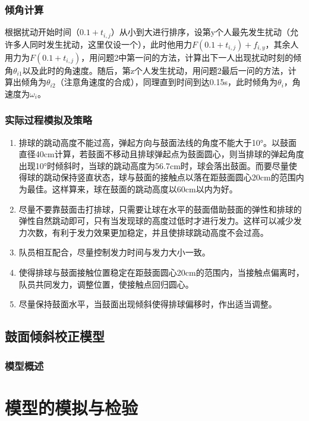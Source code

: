 \documentclass[withoutpreface,bwprint]{cumcmthesis} %
\begin{document}
\subsubsection{倾角计算}
根据扰动开始时间（$0.1+t_{i,j}$）从小到大进行排序，设第y个人最先发生扰动（允许多人同时发生扰动，这里仅设一个），此时他用力$F(0.1+t_{i,j})+f_{i,y}$，其余人用力为$F(0.1+t_{i,j})$，用问题2中第一问的方法，计算出下一人出现扰动时刻的倾角$\theta_{i1}$以及此时的角速度。随后，第z个人发生扰动，用问题2最后一问的方法，计算出倾角为$\theta _{i2}$（注意角速度的合成），同理直到时间到达0.15s，此时倾角为$\theta_{i}$，角速度为$\omega_i$。

\subsubsection{实际过程模拟及策略}
\begin{enumerate}
\item 排球的跳动高度不能过高，弹起方向与鼓面法线的角度不能大于10°。以鼓面直径40cm计算，若鼓面不移动且排球弹起点为鼓面圆心，则当排球的弹起角度出现10°时倾斜时，当球的跳动高度为56.7cm时，球会落出鼓面。而要尽量使得球的跳动保持竖直状态，球与鼓面的接触点以落在距鼓面圆心20cm的范围内为最佳。这样算来，球在鼓面的跳动高度以60cm以内为好。
\item 尽量不要靠鼓面击打排球，只需要让球在水平的鼓面借助鼓面的弹性和排球的弹性自然跳动即可，只有当发现球的高度过低时才进行发力。这样可以减少发力次数，有利于发力效果更加稳定，并且使排球跳动高度不会过高。
\item 队员相互配合，尽量控制发力时间与发力大小一致。
\item 使得排球与鼓面接触位置稳定在距鼓面圆心20cm的范围内，当接触点偏离时，队员共同发力，调整位置，使接触点回归圆心。
\item 尽量保持鼓面水平，当鼓面出现倾斜使得排球偏移时，作出适当调整。
\end{enumerate}

\subsection{鼓面倾斜校正模型}
\subsubsection{模型概述}


\section{模型的模拟与检验}
\end{document}
